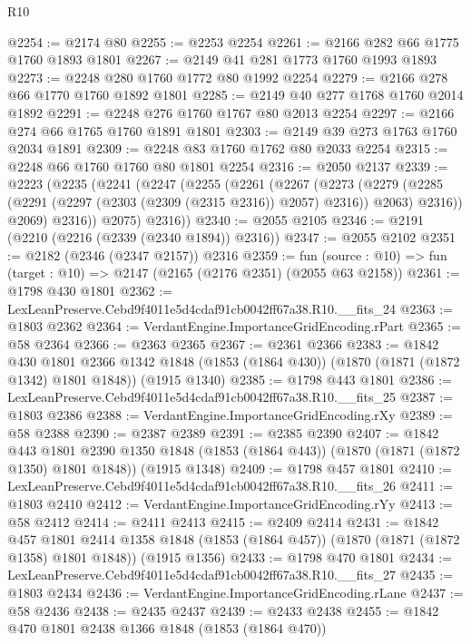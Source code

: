 \begin{lexlean}{R10}
\begin{coremodule}
@2254 := @2174 @80
@2255 := @2253 @2254
@2261 := @2166 @282 @66 @1775 @1760 @1893 @1801
@2267 := @2149 @41 @281 @1773 @1760 @1993 @1893
@2273 := @2248 @280 @1760 @1772 @80 @1992 @2254
@2279 := @2166 @278 @66 @1770 @1760 @1892 @1801
@2285 := @2149 @40 @277 @1768 @1760 @2014 @1892
@2291 := @2248 @276 @1760 @1767 @80 @2013 @2254
@2297 := @2166 @274 @66 @1765 @1760 @1891 @1801
@2303 := @2149 @39 @273 @1763 @1760 @2034 @1891
@2309 := @2248 @83 @1760 @1762 @80 @2033 @2254
@2315 := @2248 @66 @1760 @1760 @80 @1801 @2254
@2316 := @2050 @2137
@2339 := @2223
    (@2235
      (@2241
        (@2247
          (@2255
            (@2261
              (@2267
                (@2273
                  (@2279
                    (@2285 (@2291 (@2297 (@2303 (@2309 (@2315 @2316)) @2057) @2316)) @2063)
                    @2316))
                @2069)
              @2316))
          @2075)
        @2316))
@2340 := @2055 @2105
@2346 := @2191 (@2210 (@2216 (@2339 (@2340 @1894)) @2316))
@2347 := @2055 @2102
@2351 := @2182 (@2346 (@2347 @2157)) @2316
@2359 := fun (source : @10) => fun (target : @10) => @2147 (@2165 (@2176 @2351) (@2055 @63 @2158))
@2361 := @1798 @430 @1801
@2362 := LexLeanPreserve.Cebd9f4011e5d4cdaf91cb0042ff67a38.R10.__fits_24
@2363 := @1803 @2362
@2364 := VerdantEngine.ImportanceGridEncoding.rPart
@2365 := @58 @2364
@2366 := @2363 @2365
@2367 := @2361 @2366
@2383 := @1842
    @430
    @1801
    @2366
    @1342
    @1848
    (@1853 (@1864 @430))
    (@1870 (@1871 (@1872 @1342) @1801 @1848))
    (@1915 @1340)
@2385 := @1798 @443 @1801
@2386 := LexLeanPreserve.Cebd9f4011e5d4cdaf91cb0042ff67a38.R10.__fits_25
@2387 := @1803 @2386
@2388 := VerdantEngine.ImportanceGridEncoding.rXy
@2389 := @58 @2388
@2390 := @2387 @2389
@2391 := @2385 @2390
@2407 := @1842
    @443
    @1801
    @2390
    @1350
    @1848
    (@1853 (@1864 @443))
    (@1870 (@1871 (@1872 @1350) @1801 @1848))
    (@1915 @1348)
@2409 := @1798 @457 @1801
@2410 := LexLeanPreserve.Cebd9f4011e5d4cdaf91cb0042ff67a38.R10.__fits_26
@2411 := @1803 @2410
@2412 := VerdantEngine.ImportanceGridEncoding.rYy
@2413 := @58 @2412
@2414 := @2411 @2413
@2415 := @2409 @2414
@2431 := @1842
    @457
    @1801
    @2414
    @1358
    @1848
    (@1853 (@1864 @457))
    (@1870 (@1871 (@1872 @1358) @1801 @1848))
    (@1915 @1356)
@2433 := @1798 @470 @1801
@2434 := LexLeanPreserve.Cebd9f4011e5d4cdaf91cb0042ff67a38.R10.__fits_27
@2435 := @1803 @2434
@2436 := VerdantEngine.ImportanceGridEncoding.rLane
@2437 := @58 @2436
@2438 := @2435 @2437
@2439 := @2433 @2438
@2455 := @1842
    @470
    @1801
    @2438
    @1366
    @1848
    (@1853 (@1864 @470))

\end{coremodule}
\end{lexlean}
